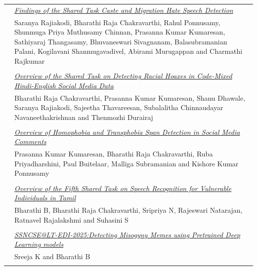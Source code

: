 \documentclass[11pt,oneside]{book}
\begin{document}
\begin{tabular}{p{24mm}p{124mm}}
                
                      & \hyperlink{page.214}{\emph{Findings of the Shared Task Caste and Migration Hate Speech Detection}}\\
        & Saranya Rajiakodi\index{Rajiakodi}, Bharathi Raja Chakravarthi\index{Chakravarthi}, Rahul Ponnusamy\index{Ponnusamy}, Shunmuga Priya Muthusamy Chinnan\index{Chinnan}, Prasanna Kumar Kumaresan\index{Kumaresan}, Sathiyaraj Thangasamy\index{Thangasamy}, Bhuvaneswari Sivagnanam\index{Sivagnanam}, Balasubramanian Palani\index{Palani}, Kogilavani Shanmugavadivel\index{Shanmugavadivel}, Abirami Murugappan\index{Murugappan} and Charmathi Rajkumar\index{Rajkumar}\\\\
                
                      & \hyperlink{page.221}{\emph{Overview of the Shared Task on Detecting Racial Hoaxes in Code-Mixed Hindi-English Social Media Data}}\\
        & Bharathi Raja Chakravarthi\index{Chakravarthi}, Prasanna Kumar Kumaresan\index{Kumaresan}, Shanu Dhawale\index{Dhawale}, Saranya Rajiakodi\index{Rajiakodi}, Sajeetha Thavareesan\index{Thavareesan}, Subalalitha Chinnaudayar Navaneethakrishnan\index{Navaneethakrishnan} and Thenmozhi Durairaj\index{Durairaj}\\\\
                
                      & \hyperlink{page.228}{\emph{Overview of Homophobia and Transphobia Span Detection in Social Media Comments}}\\
        & Prasanna Kumar Kumaresan\index{Kumaresan}, Bharathi Raja Chakravarthi\index{Chakravarthi}, Ruba Priyadharshini\index{Priyadharshini}, Paul Buitelaar\index{Buitelaar}, Malliga Subramanian\index{Subramanian} and Kishore Kumar Ponnusamy\index{Ponnusamy}\\\\
                
                      & \hyperlink{page.234}{\emph{Overview of the Fifth Shared Task on Speech Recognition for Vulnerable Individuals in Tamil}}\\
        & Bharathi B\index{B}, Bharathi Raja Chakravarthi\index{Chakravarthi}, Sripriya N\index{N}, Rajeswari Natarajan\index{Natarajan}, Ratnavel Rajalakshmi\index{Rajalakshmi} and Suhasini S\index{S}\\\\
                
                      & \hyperlink{page.1}{\emph{SSNCSE@LT-EDI-2025:Detecting Misogyny Memes using Pretrained Deep Learning models}}\\
        & Sreeja K\index{K} and Bharathi B\index{B}\\\\
              \end{tabular}
\end{document}
